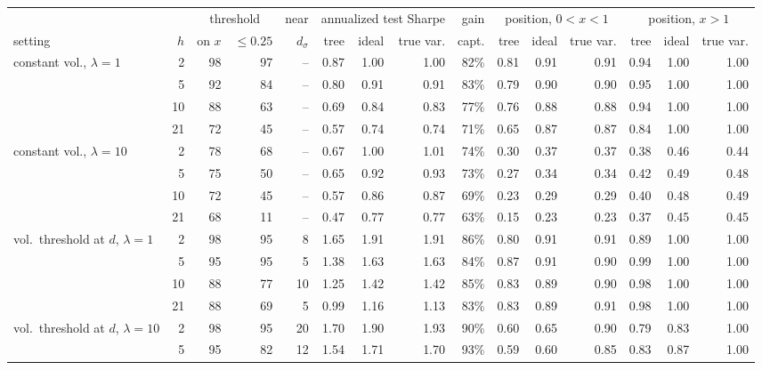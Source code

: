 \documentclass[11pt,a4paper]{article}
\newcommand{\1}{\mathbf{1}}
\begin{document}
\begin{table}[H]
\centering\scriptsize
\setlength{\tabcolsep}{2.4pt}
\begin{tabular}{@{}l r rr r rrr r rrr rrr@{}}
\toprule
& & \multicolumn{2}{c}{threshold} & near & \multicolumn{3}{c}{annualized test Sharpe} & gain & \multicolumn{3}{c}{position, $0<x<1$} & \multicolumn{3}{c}{position, $x>1$}\\
\cmidrule(lr){3-4}\cmidrule(lr){6-8}\cmidrule(lr){10-12}\cmidrule(lr){13-15}
setting & $h$ & on $x$ & $\le0.25$ & $d_\sigma$ & tree & ideal & true var. & capt. & tree & ideal & true var. & tree & ideal & true var.\\
\midrule
constant vol., $\lambda=1$ & 2 & 98 & 97 & -- & 0.87 & 1.00 & 1.00 & 82\% & 0.81 & 0.91 & 0.91 & 0.94 & 1.00 & 1.00\\
 & 5 & 92 & 84 & -- & 0.80 & 0.91 & 0.91 & 83\% & 0.79 & 0.90 & 0.90 & 0.95 & 1.00 & 1.00\\
 & 10 & 88 & 63 & -- & 0.69 & 0.84 & 0.83 & 77\% & 0.76 & 0.88 & 0.88 & 0.94 & 1.00 & 1.00\\
 & 21 & 72 & 45 & -- & 0.57 & 0.74 & 0.74 & 71\% & 0.65 & 0.87 & 0.87 & 0.84 & 1.00 & 1.00\\
\midrule
constant vol., $\lambda=10$ & 2 & 78 & 68 & -- & 0.67 & 1.00 & 1.01 & 74\% & 0.30 & 0.37 & 0.37 & 0.38 & 0.46 & 0.44\\
 & 5 & 75 & 50 & -- & 0.65 & 0.92 & 0.93 & 73\% & 0.27 & 0.34 & 0.34 & 0.42 & 0.49 & 0.48\\
 & 10 & 72 & 45 & -- & 0.57 & 0.86 & 0.87 & 69\% & 0.23 & 0.29 & 0.29 & 0.40 & 0.48 & 0.49\\
 & 21 & 68 & 11 & -- & 0.47 & 0.77 & 0.77 & 63\% & 0.15 & 0.23 & 0.23 & 0.37 & 0.45 & 0.45\\
\midrule
vol.\ threshold at $d$, $\lambda=1$ & 2 & 98 & 95 & 8 & 1.65 & 1.91 & 1.91 & 86\% & 0.80 & 0.91 & 0.91 & 0.89 & 1.00 & 1.00\\
 & 5 & 95 & 95 & 5 & 1.38 & 1.63 & 1.63 & 84\% & 0.87 & 0.91 & 0.90 & 0.99 & 1.00 & 1.00\\
 & 10 & 88 & 77 & 10 & 1.25 & 1.42 & 1.42 & 85\% & 0.83 & 0.89 & 0.90 & 0.98 & 1.00 & 1.00\\
 & 21 & 88 & 69 & 5 & 0.99 & 1.16 & 1.13 & 83\% & 0.83 & 0.89 & 0.91 & 0.98 & 1.00 & 1.00\\
\midrule
vol.\ threshold at $d$, $\lambda=10$ & 2 & 98 & 95 & 20 & 1.70 & 1.90 & 1.93 & 90\% & 0.60 & 0.65 & 0.90 & 0.79 & 0.83 & 1.00\\
 & 5 & 95 & 82 & 12 & 1.54 & 1.71 & 1.70 & 93\% & 0.59 & 0.60 & 0.85 & 0.83 & 0.87 & 1.00\\

\end{tabular}
\end{table}
\end{document}
